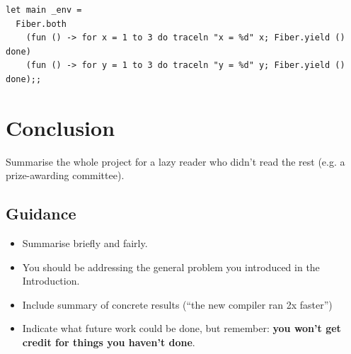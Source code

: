 \documentclass{l4proj}
\begin{document}
\noindent\begin{minipage}{\linewidth}
\lstset{style=ocamlstyle}
\begin{lstlisting}[caption={Example of running two threads of execution concurrently using Eio.Fiber \colorbox{yellow}{referenceHere}}, label={lst:eio}]
let main _env =
  Fiber.both
    (fun () -> for x = 1 to 3 do traceln "x = %d" x; Fiber.yield () done)
    (fun () -> for y = 1 to 3 do traceln "y = %d" y; Fiber.yield () done);;
\end{lstlisting}
\end{minipage}


\chapter{Conclusion}    
Summarise the whole project for a lazy reader who didn't read the rest (e.g. a prize-awarding committee).
\section{Guidance}
\begin{itemize}
    \item
        Summarise briefly and fairly.
    \item
        You should be addressing the general problem you introduced in the
        Introduction.        
    \item
        Include summary of concrete results (``the new compiler ran 2x
        faster'')
    \item
        Indicate what future work could be done, but remember: \textbf{you
        won't get credit for things you haven't done}.
\end{itemize}

%
% 
\end{document}
